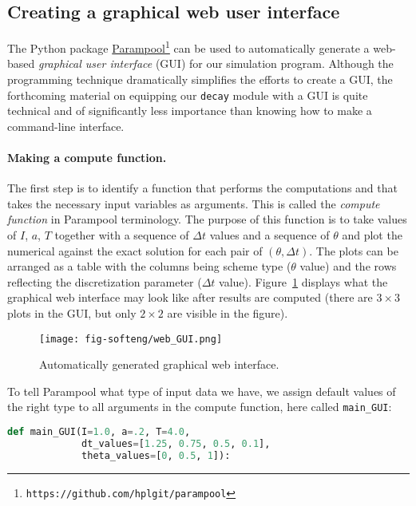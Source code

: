 \documentclass[graybox,sectrefs,envcountresetchap,open=right,final]{svmonodo}
\begin{document}
\subsection{Creating a graphical web user interface}
\label{softeng1:basic:UI:parampool}

The Python package \href{{https://github.com/hplgit/parampool}}{Parampool}\footnote{\texttt{https://github.com/hplgit/parampool}}
can be used to automatically generate a web-based \emph{graphical user interface}
(GUI) for our simulation program. Although the programming technique
dramatically simplifies the efforts to create a GUI, the forthcoming
material on equipping our \texttt{decay} module with a GUI is quite technical
and of significantly less importance than knowing how to make
a command-line interface.

\paragraph{Making a compute function.}
The first step is to identify a function
that performs the computations and that takes the necessary input
variables as arguments. This is called the \emph{compute function} in
Parampool terminology. The purpose of this function is to take
values of $I$, $a$, $T$ together with a sequence of $\Delta t$ values
and a sequence of $\theta$ and plot the numerical against the
exact solution for each pair of $(\theta, \Delta t)$.
The plots can be arranged as a table with the columns being scheme type
($\theta$ value) and the rows reflecting the discretization parameter
($\Delta t$ value). Figure~\ref{softeng1:fig:GUI} displays what the
graphical web interface may look like after results are computed
(there are $3\times 3$ plots in the GUI, but only $2\times 2$ are
visible in the figure).

\begin{figure}[!ht]  %
  \centerline{\texttt{[image: fig-softeng/web\_GUI.png]}}
  \caption{
  Automatically generated graphical web interface. \label{softeng1:fig:GUI}
  }
\end{figure}

To tell Parampool what type of input data we have,
we assign default values of the right type to all arguments in the
compute function, here called \Verb!main_GUI!:





\begin{lstlisting}[language=python,style=blue1_bluegreen]
def main_GUI(I=1.0, a=.2, T=4.0,
             dt_values=[1.25, 0.75, 0.5, 0.1],
             theta_values=[0, 0.5, 1]):

\end{lstlisting}
\end{document}
